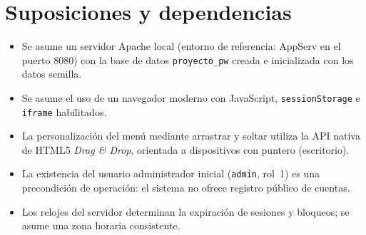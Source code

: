 \section{Suposiciones y dependencias}

\begin{itemize}
    \item Se asume un servidor Apache local (entorno de referencia: AppServ
          en el puerto 8080) con la base de datos \texttt{proyecto\_pw}
          creada e inicializada con los datos semilla.
    \item Se asume el uso de un navegador moderno con JavaScript,
          \texttt{sessionStorage} e \texttt{iframe} habilitados.
    \item La personalización del menú mediante arrastrar y soltar utiliza la
          API nativa de HTML5 \textit{Drag \& Drop}, orientada a dispositivos
          con puntero (escritorio).
    \item La existencia del usuario administrador inicial
          (\texttt{admin}, rol~1) es una precondición de operación: el
          sistema no ofrece registro público de cuentas.
    \item Los relojes del servidor determinan la expiración de sesiones y
          bloqueos; se asume una zona horaria consistente.
\end{itemize}
